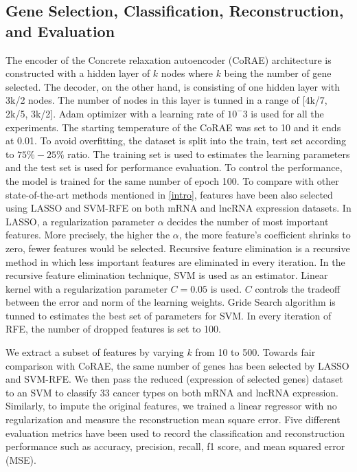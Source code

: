 \documentclass{bioinfo}
\begin{document}
{\subsection{Gene Selection, Classification, Reconstruction, and Evaluation} \label{method-details}
The encoder of the Concrete relaxation autoencoder (CoRAE) architecture is constructed with a hidden layer of $k$ nodes where $k$ being the number of gene selected. The decoder, on the other hand, is consisting of one hidden layer with 3k/2 nodes. The number of nodes in this layer is tunned in a range of [4k/7, 2k/5, 3k/2]. Adam optimizer with a learning rate of $10^-3$ is used for all the experiments. The starting temperature of the CoRAE was set to 10 and it ends at 0.01. To avoid overfitting, the dataset is split into the train, test set according to $75\%-25\%$ ratio. The training set is used to estimates the learning parameters and the test set is used for performance evaluation. To control the performance, the model is trained for the same number of epoch 100. 
To compare with other state-of-the-art methods mentioned in \ref{intro}, features have been also selected using LASSO and SVM-RFE on both mRNA and lncRNA expression datasets. In LASSO, a regularization parameter $\alpha$ decides the number of most important features. More precisely, the higher the $\alpha$, the more feature's coefficient shrinks to zero, fewer features would be selected. Recursive feature elimination is a recursive method in which less important features are eliminated in every iteration. In the recursive feature elimination technique, SVM is used as an estimator. Linear kernel with 
a regularization parameter $C=0.05$ is used. $C$ controls the tradeoff between the error and norm of the learning weights. Gride Search algorithm is tunned to estimates the best set of parameters for SVM. In every iteration of RFE, the number of dropped features is set to 100. 

We extract a subset of features by varying $k$ from 10 to 500. Towards fair comparison with CoRAE, the same number of genes has been selected by LASSO and SVM-RFE. We then pass the reduced (expression of selected genes) dataset to an SVM to classify 33 cancer types on both mRNA and lncRNA expression. Similarly, to impute the original features, we trained a linear regressor with no regularization and measure the reconstruction mean square error. 
Five different evaluation metrics have been used to record the classification and reconstruction performance such as accuracy, precision, recall, f1 score, and mean squared error (MSE). 

}
\end{document}

